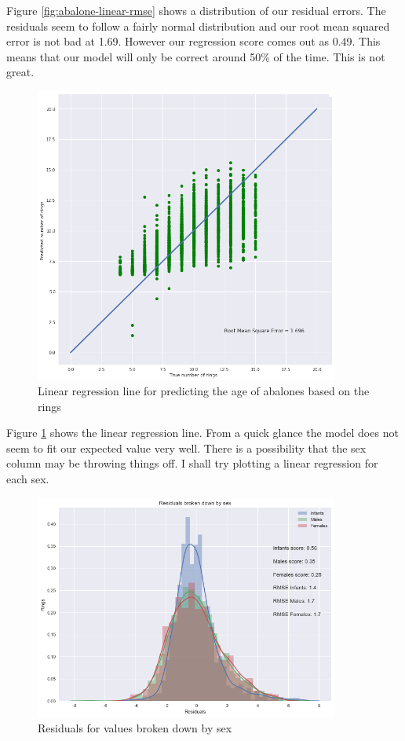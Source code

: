 Figure \ref{fig:abalone-linear-rmse} shows a distribution of our residual errors. The residuals seem to follow a fairly normal distribution and our root mean squared error is not bad at 1.69. However our regression score comes out as 0.49. This means that our model will only be correct around 50\% of the time. This is not great.
\begin{figure}[H]
  \centering
  \includegraphics[scale=0.5,width=100mm]{./images/abalone-linear-regression-line.png}
  \caption{Linear regression line for predicting the age of abalones based on the rings}
  \label{fig:abalone-linear-regression-line}
\end{figure}
Figure \ref{fig:abalone-linear-regression-line} shows the linear regression line. From a quick glance the model does not seem to fit our expected value very well. There is a possibility that the sex column may be throwing things off. I shall try plotting a linear regression for each sex. 

\begin{figure}[H]
  \centering
  \includegraphics[scale=0.5,width=100mm]{./images/abalone-linear-regression-hist-sex.png}
  \caption{Residuals for values broken down by sex}
  \label{fig:abalone-linear-regression-hist-sex}
\end{figure}

